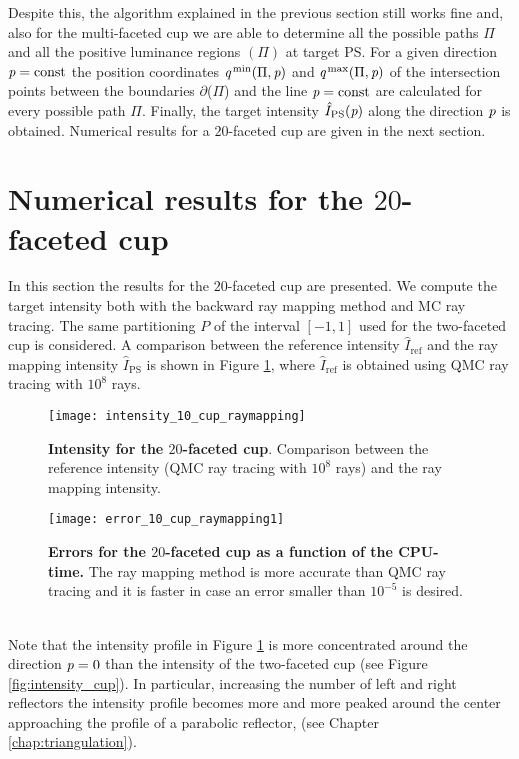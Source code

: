 Despite this, the algorithm explained in the previous section still works fine and, also for the multi-faceted cup we are able to determine all the possible paths $\Pi$ and all the positive luminance regions $(\Pi)$ at target PS.
For a given direction $\textit{p}=\mbox{const}$ the position coordinates $\textit{q}^\textrm{\,min}(\Pi,\textit{p})$ and $\textit{q}^\textrm{\,max}(\Pi,\textit{p})$ of the intersection points between the boundaries $ \partial$($\Pi$) and the line $\textit{p}= \mbox{const}$ are calculated for every possible path $\Pi$. Finally, the target intensity $\hat{I}_{\textrm{PS}}(\textit{p})$ along the direction $\textit{p}$ is obtained.
Numerical results for a $20$-faceted cup are given in the next section.
\section{Numerical results for the $20$-faceted cup}
\label{sec:Numerical results_10cup}
In this section the results for the $20$-faceted cup are presented.
We compute the target intensity both with the backward ray mapping method and MC ray tracing.
The same partitioning $P$ of the interval $[-1,1]$ used for the two-faceted cup is considered. A comparison between the reference intensity $\hat{I}_{\textrm{ref}}$ and the ray mapping intensity $\hat{I}_{\textrm{PS}}$ is shown in Figure \ref{fig:intensity10cup}, where $\hat{I}_{\textrm{ref}}$ is obtained using QMC ray tracing with $10^8$ rays.
\begin{figure}[h!]
\centering
\texttt{[image: intensity\_10\_cup\_raymapping]}
\caption{\textbf{Intensity for the $20$-faceted cup}.
Comparison between the reference intensity (QMC ray tracing with $10^8$ rays) and the ray mapping intensity.}
\label{fig:intensity10cup}
\end{figure}
\begin{figure}[h!]
\centering
\texttt{[image: error\_10\_cup\_raymapping1]}
\caption{\textbf{Errors for the $20$-faceted cup as a function of the CPU-time.} The ray mapping method is more accurate than QMC ray tracing and it is faster in case an error smaller than $10^{-5}$ is desired.}
\label{fig:error10cup} 
\end{figure}
\\ \indent Note that the intensity profile in Figure \ref{fig:intensity10cup} is more concentrated around the direction $\textit{p}=0$ than the intensity of the two-faceted cup (see Figure \ref{fig:intensity_cup}). In particular, increasing the number of left and right reflectors the intensity profile becomes more and more peaked around the center approaching the profile of a parabolic reflector, (see Chapter \ref{chap:triangulation}).

